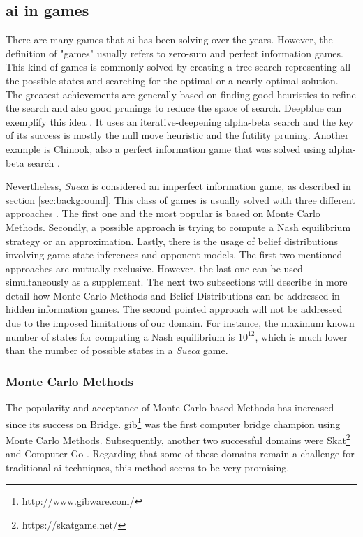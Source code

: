 \subsection{\gls{ai} in games}
 
There are many games that \gls{ai} has been solving over the years.
However, the definition of "games" usually refers to zero-sum and perfect information games.
This kind of games is commonly solved by creating a tree search representing all the possible states and searching for the optimal or a nearly optimal solution.
The greatest achievements are generally based on finding good heuristics to refine the search and also good prunings to reduce the space of search.
Deepblue can exemplify this idea \cite{Campbell2002}.
It uses an iterative-deepening alpha-beta search and the key of its success is mostly the null move heuristic and the futility pruning.
Another example is Chinook, also a perfect information game that was solved using alpha-beta search \cite{Schaeffer1996}.

Nevertheless, \emph{Sueca} is considered an imperfect information game, as described in section \ref{sec:background}.
This class of games is usually solved with three different approaches \cite{Cowling2012}.
The first one and the most popular is based on Monte Carlo Methods.
Secondly, a possible approach is trying to compute a Nash equilibrium strategy or an approximation.
Lastly, there is the usage of belief distributions involving game state inferences and opponent models.
The first two mentioned approaches are mutually exclusive.
However, the last one can be used simultaneously as a supplement.
The next two subsections will describe in more detail how Monte Carlo Methods and Belief Distributions can be addressed in hidden information games.
The second pointed approach will not be addressed due to the imposed limitations of our domain.
For instance, the maximum known number of states for computing a Nash equilibrium is $10^{12}$, which is much lower than the number of possible states in a \emph{Sueca} game.




\subsubsection{Monte Carlo Methods}

The popularity and acceptance of Monte Carlo based Methods has increased since its success on Bridge.
\gls{gib}\footnote{http://www.gibware.com/} was the first computer bridge champion using Monte Carlo Methods.
Subsequently, another two successful domains were Skat\footnote{https://skatgame.net/} and Computer Go \cite{Gelly2011}.
Regarding that some of these domains remain a challenge for traditional \gls{ai} techniques, this method seems to be very promising.


